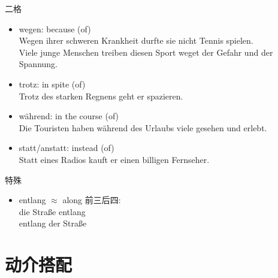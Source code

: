 二格
\begin{itemize}
    \item wegen: because (of) \\
          Wegen ihrer schweren Krankheit durfte sie nicht Tennis spielen. \\
          Viele junge Menschen treiben diesen Sport weget der Gefahr und der Spannung.
    \item trotz: in spite (of) \\
          Trotz des starken Regnens geht er spazieren.
    \item während: in the course (of) \\
          Die Touristen haben während des Urlaubs viele gesehen und erlebt.
    \item statt/anstatt: instead (of) \\
          Statt eines Radios kauft er einen billigen Fernseher.
\end{itemize}

特殊
\begin{itemize}
    \item entlang $\approx$ along 前三后四: \\
          die Straße entlang \\
          entlang der Straße
\end{itemize}

\section{动介搭配}

